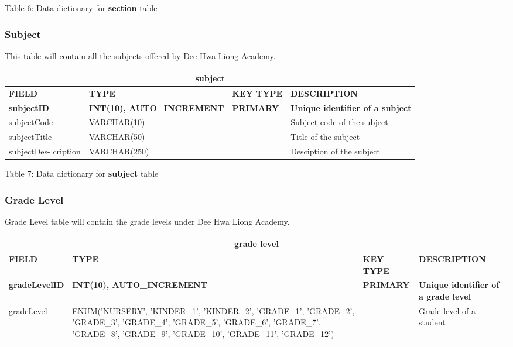 \documentclass[11pt,a4paper,titlepage]{article}
\begin{document}
\vspace{.5cm}
\begin{center}
    Table 6: Data dictionary for \textbf{section} table
\end{center}


\subsubsection{Subject}

This table will contain all the subjects offered by Dee Hwa Liong Academy.

\vspace{1cm}
\begin{longtable}{ |p{2.5cm}|p{4.5cm}|p{2.5cm}|p{3cm}|  }
    \hline
    \multicolumn{4}{|c|}{\textbf{subject}} \\
    \hline
    \textbf{FIELD}&\textbf{TYPE}&\textbf{KEY TYPE}&\textbf{DESCRIPTION}\\
    \hline
    \textbf{subjectID}   & \textbf{INT(10), AUTO\_INCREMENT} & \textbf{PRIMARY} & \textbf{Unique identifier of a subject}\\ \hline
    subjectCode & VARCHAR(10) & & Subject code of the subject \\ \hline
    subjectTitle & VARCHAR(50) & & Title of the subject \\ \hline
    subjectDes- cription & VARCHAR(250) & & Desciption of the subject \\ \hline
\end{longtable}

\vspace{.5cm}
\begin{center}
    Table 7: Data dictionary for \textbf{subject} table
\end{center}


\subsubsection{Grade Level}

Grade Level table will contain the grade levels under Dee Hwa Liong Academy.

\vspace{1cm}
\begin{longtable}{ |p{2.5cm}|p{4.5cm}|p{2.5cm}|p{3cm}|  }
    \hline
    \multicolumn{4}{|c|}{\textbf{grade level}} \\
    \hline
    \textbf{FIELD}&\textbf{TYPE}&\textbf{KEY TYPE}&\textbf{DESCRIPTION}\\
    \hline
    \textbf{gradeLevelID}   & \textbf{INT(10), AUTO\_INCREMENT} & \textbf{PRIMARY} & \textbf{Unique identifier of a grade level}\\ \hline
    gradeLevel & ENUM('NURSERY', 'KINDER\_1', 'KINDER\_2', 'GRADE\_1', 'GRADE\_2', 'GRADE\_3', 'GRADE\_4', 'GRADE\_5', 'GRADE\_6', 'GRADE\_7', 'GRADE\_8', 'GRADE\_9', 'GRADE\_10', 'GRADE\_11', 'GRADE\_12') & & Grade level of a student \\ \hline
\end{longtable}
\end{document}
